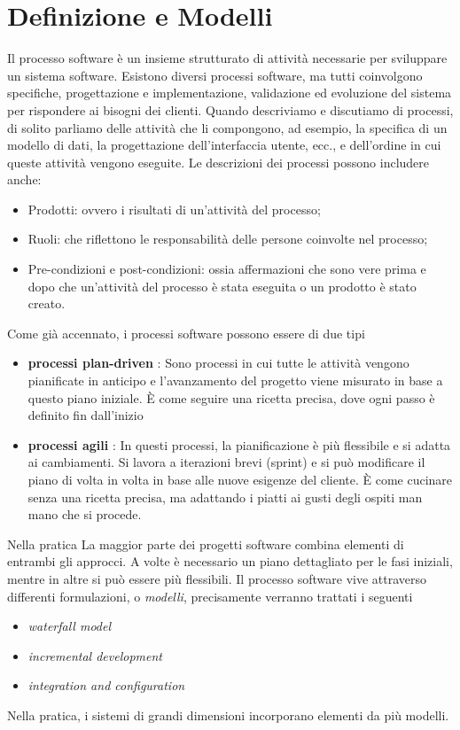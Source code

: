 \documentclass[10pt, letterpaper]{report}
\begin{document}
\section{Definizione e Modelli}
  Il processo software è un insieme strutturato di attività necessarie per 
sviluppare un sistema software.
Esistono diversi processi software, ma tutti coinvolgono specifiche, progettazione e 
implementazione, validazione ed evoluzione del sistema per rispondere ai bisogni dei clienti.\acc 
Quando descriviamo e discutiamo di processi, di solito parliamo delle attività che 
li compongono, ad esempio, la specifica di un modello di dati, 
la progettazione dell'interfaccia utente, ecc., e dell'ordine in cui queste attività vengono eseguite.
Le descrizioni dei processi possono includere anche:\begin{itemize}
    \item Prodotti: ovvero i risultati di un'attività del processo;
    \item Ruoli: che riflettono le responsabilità delle persone coinvolte nel processo;
    \item Pre-condizioni e post-condizioni: ossia affermazioni che sono vere prima e dopo che un'attività del processo è stata eseguita o un prodotto è stato creato.
\end{itemize}
Come già accennato, i processi software possono essere di due tipi\begin{itemize}
    \item \textbf{processi plan-driven} : Sono processi in cui tutte le attività vengono
     pianificate in anticipo e l'avanzamento del progetto viene misurato in base a 
     questo piano iniziale. È come seguire una ricetta precisa, dove ogni passo è 
     definito fin dall'inizio 
     \item \textbf{processi agili} : In questi processi, la pianificazione è più flessibile
      e si adatta ai cambiamenti. Si lavora a iterazioni brevi (sprint) e si può modificare 
      il piano di volta in volta in base alle nuove esigenze del cliente. È come cucinare 
      senza una ricetta precisa, ma adattando i piatti ai gusti degli ospiti man mano che 
      si procede.
\end{itemize}
Nella pratica La maggior parte dei progetti software combina elementi di entrambi gli approcci. A volte è necessario un piano dettagliato per le fasi iniziali, mentre in altre si può essere più flessibili.\acc 
Il processo software vive attraverso differenti formulazioni, o \textit{modelli}, precisamente verranno trattati i seguenti\begin{itemize}
    \item \textit{waterfall model} 
    \item \textit{incremental development}
    \item \textit{integration and configuration}
\end{itemize}
Nella pratica, i sistemi di grandi dimensioni incorporano elementi da più modelli.
\end{document}
